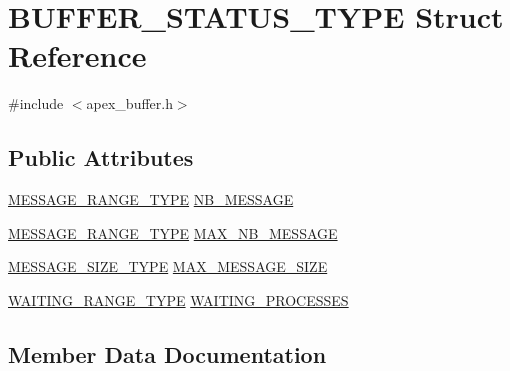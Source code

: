 \hypertarget{structBUFFER__STATUS__TYPE}{}\section{B\+U\+F\+F\+E\+R\+\_\+\+S\+T\+A\+T\+U\+S\+\_\+\+T\+Y\+PE Struct Reference}
\label{structBUFFER__STATUS__TYPE}


{\ttfamily \#include $<$apex\+\_\+buffer.\+h$>$}

\subsection*{Public Attributes}
\begin{DoxyCompactItemize}
\item 
\hyperlink{apex__types_8h_aeffd61fe45ce21b94c1f0b5b84e614ea}{M\+E\+S\+S\+A\+G\+E\+\_\+\+R\+A\+N\+G\+E\+\_\+\+T\+Y\+PE} \hyperlink{structBUFFER__STATUS__TYPE_ae49c54adc35953d97b6c57a6f3e09dbe}{N\+B\+\_\+\+M\+E\+S\+S\+A\+GE}
\item 
\hyperlink{apex__types_8h_aeffd61fe45ce21b94c1f0b5b84e614ea}{M\+E\+S\+S\+A\+G\+E\+\_\+\+R\+A\+N\+G\+E\+\_\+\+T\+Y\+PE} \hyperlink{structBUFFER__STATUS__TYPE_a9f2297f77ab4f10ee8b30699daecf21e}{M\+A\+X\+\_\+\+N\+B\+\_\+\+M\+E\+S\+S\+A\+GE}
\item 
\hyperlink{apex__types_8h_ae09494a8d78c38c94f0cc5a80e69785a}{M\+E\+S\+S\+A\+G\+E\+\_\+\+S\+I\+Z\+E\+\_\+\+T\+Y\+PE} \hyperlink{structBUFFER__STATUS__TYPE_aab3c338f1ee48b1043ec79b53c206595}{M\+A\+X\+\_\+\+M\+E\+S\+S\+A\+G\+E\+\_\+\+S\+I\+ZE}
\item 
\hyperlink{apex__process_8h_a77a39a661169092676366eec0d65ab1c}{W\+A\+I\+T\+I\+N\+G\+\_\+\+R\+A\+N\+G\+E\+\_\+\+T\+Y\+PE} \hyperlink{structBUFFER__STATUS__TYPE_ab631c9b531559f7782c6084c0ac5228c}{W\+A\+I\+T\+I\+N\+G\+\_\+\+P\+R\+O\+C\+E\+S\+S\+ES}
\end{DoxyCompactItemize}


\subsection{Member Data Documentation}

